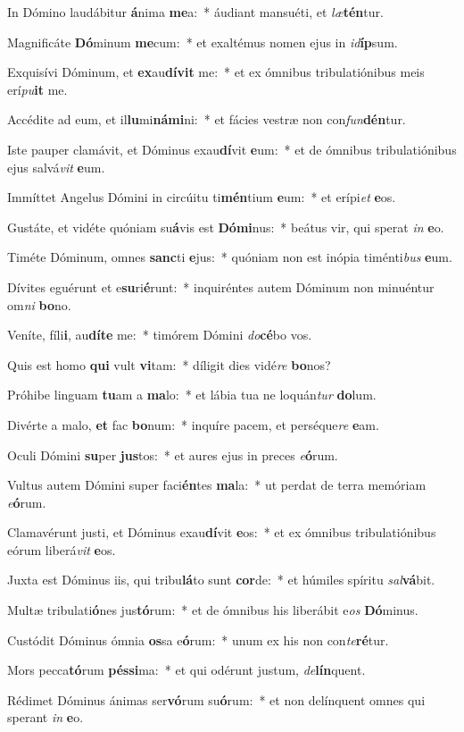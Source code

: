 \item In Dómino laudábitur \textbf{á}nima \textbf{me}a:~* áudiant mansuéti, et \textit{læ}\textbf{tén}tur.
\item Magnificáte \textbf{Dó}minum \textbf{me}cum:~* et exaltémus nomen ejus in \textit{id}\textbf{íp}sum.
\item Exquisívi Dóminum, et \textbf{ex}au\textbf{dí}\textbf{vit} me:~* et ex ómnibus tribulatiónibus meis erí\textit{pu}\textbf{it} me.
\item Accédite ad eum, et il\textbf{lu}mi\textbf{ná}\textbf{mi}ni:~* et fácies vestræ non con\textit{fun}\textbf{dén}tur.
\item Iste pauper clamávit, et Dóminus exau\textbf{dí}vit \textbf{e}um:~* et de ómnibus tribulatiónibus ejus salvá\textit{vit} \textbf{e}um.
\item Immíttet Angelus Dómini in circúitu ti\textbf{mén}tium \textbf{e}um:~* et erípi\textit{et} \textbf{e}os.
\item Gustáte, et vidéte quóniam su\textbf{á}vis est \textbf{Dó}\textbf{mi}nus:~* beátus vir, qui sperat \textit{in} \textbf{e}o.
\item Timéte Dóminum, omnes \textbf{sanc}ti \textbf{e}jus:~* quóniam non est inópia timénti\textit{bus} \textbf{e}um.
\item Dívites eguérunt et e\textbf{su}ri\textbf{é}runt:~* inquiréntes autem Dóminum non minuéntur om\textit{ni} \textbf{bo}no.
\item Veníte, fíli\textbf{i}, au\textbf{dí}\textbf{te} me:~* timórem Dómini \textit{do}\textbf{cé}bo vos.
\item Quis est homo \textbf{qui} vult \textbf{vi}tam:~* díligit dies vidé\textit{re} \textbf{bo}nos?
\item Próhibe linguam \textbf{tu}am a \textbf{ma}lo:~* et lábia tua ne loquán\textit{tur} \textbf{do}lum.
\item Divérte a malo, \textbf{et} fac \textbf{bo}num:~* inquíre pacem, et perséque\textit{re} \textbf{e}am.
\item Oculi Dómini \textbf{su}per \textbf{jus}tos:~* et aures ejus in preces \textit{e}\textbf{ó}rum.
\item Vultus autem Dómini super faci\textbf{én}tes \textbf{ma}la:~* ut perdat de terra memóriam \textit{e}\textbf{ó}rum.
\item Clamavérunt justi, et Dóminus exau\textbf{dí}vit \textbf{e}os:~* et ex ómnibus tribulatiónibus eórum liberá\textit{vit} \textbf{e}os.
\item Juxta est Dóminus iis, qui tribu\textbf{lá}to sunt \textbf{cor}de:~* et húmiles spíritu \textit{sal}\textbf{vá}bit.
\item Multæ tribulati\textbf{ó}nes jus\textbf{tó}rum:~* et de ómnibus his liberábit e\textit{os} \textbf{Dó}minus.
\item Custódit Dóminus ómnia \textbf{os}sa e\textbf{ó}rum:~* unum ex his non con\textit{te}\textbf{ré}tur.
\item Mors pecca\textbf{tó}rum \textbf{pés}\textbf{si}ma:~* et qui odérunt justum, \textit{de}\textbf{lín}quent.
\item Rédimet Dóminus ánimas ser\textbf{vó}rum su\textbf{ó}rum:~* et non delínquent omnes qui sperant \textit{in} \textbf{e}o.
